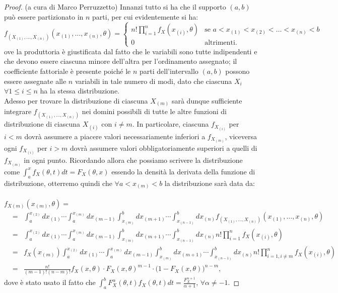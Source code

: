 \begin{proof} (a cura di Marco Perruzzetto) Innanzi tutto si ha che il supporto $(a,b)$ può essere partizionato in $n$ parti, per cui evidentemente si ha: 
\footnotesize{
\begin{displaymath}
f_{(X_{(1)},\ldots,X_{(n)})}(x_{(1)},\ldots,x_{(n)},\theta)=
\left\{
\begin{array}{lr}
n!\prod_{i=1}^n f_{X}(x_{(i)},\theta) & \mbox{se } a<x_{(1)}<x_{(2)}<\ldots <x_{(n)}<b \\
0 & \mbox{altrimenti.}
\end{array}
\right.
\end{displaymath}
} \normalsize{ove la produttoria è giustificata dal fatto che le variabili sono tutte indipendenti e che devono essere ciascuna minore dell'altra per l'ordinamento assegnato; il coefficiente fattoriale è presente poiché le $n$ parti dell'intervallo $(a,b)$ possono essere assegnate alle $n$ variabili in tale numero di modi, dato che ciascuna $X_i$ $\forall 1\leq i\leq n$ ha la stessa distribuzione.  \\ Adesso per trovare la distribuzione di ciascuna $X_{(m)}$ sarà dunque sufficiente integrare $f_{(X_{(1)},\ldots,X_{(n)})}$ nei domini possibili di tutte le altre funzioni di distribuzione di ciascuna $X_{(i)}$ con $i\neq m$. In particolare, ciascuna $f_{X_{(i)}}$ per $i<m$ dovrà assumere a piacere valori necessariamente inferiori a $f_{X_{(m)}}$, viceversa ogni $f_{X_{(i)}}$ per $i>m$ dovrà assumere valori obbligatoriamente superiori a quelli di $f_{X_{(m)}}$ in ogni punto. Ricordando allora che possiamo scrivere la distribuzione come $\int_a^x f_X(\theta,t)dt=F_X(\theta,x)$ essendo la densità la derivata della funzione di distribuzione, otterremo quindi che $\forall a<x_{(m)}<b$ la distribuzione sarà data da: \\\\ $f_{X(m)}(x_{(m)},\theta)=$	}
\small{
\begin{eqnarray*}
&=&\int_a^{x_{(2)}} dx_{(1)}\cdots\int_a^{x_{(m)}} dx_{(m-1)}\int_{x_{(m)}}^b dx_{(m+1)}\cdots\int_{x_{(n-1)}}^b dx_{(n)}f_{(X_{(1)},\ldots,X_{(n)})}(x_{(1)},\ldots,x_{(n)},\theta)\\
&=&\int_a^{x_{(2)}} dx_{(1)}\cdots\int_a^{x_{(m)}} dx_{(m-1)}\int_{x_{(m)}}^b dx_{(m+1)}\cdots\int_{x_{(n-1)}}^b dx_{(n)} n!\prod_{i=1}^n f_{X}(x_{(i)},\theta) \\
&=& f_{X}(x_{(m)})\int_a^{x_{(2)}} dx_{(1)}\cdots\int_a^{x_{(m)}} dx_{(m-1)}\int_{x_{(m)}}^b dx_{(m+1)}\cdots\int_{x_{(n-1)}}^b dx_{(n)} n!\prod_{i=1,i\neq m}^n f_{X}(x_{(i)},\theta) \\
&=& \frac{n!}{(m-1)!(n-m)!}f_X\left(x,\theta\right)\cdot F_X\left(x,\theta\right)^{m-1}\cdot \big(1-F_X\left(x,\theta\right)\big)^{n-m}, 
\end{eqnarray*}
}
\normalsize{dove è stato usato il fatto che $\int_a^b F_X^\alpha(\theta, t)f_X(\theta,t)dt=\frac{F_X^{\alpha+1}}{\alpha+1}$, $\forall \alpha\neq -1$.}
\end{proof} 

